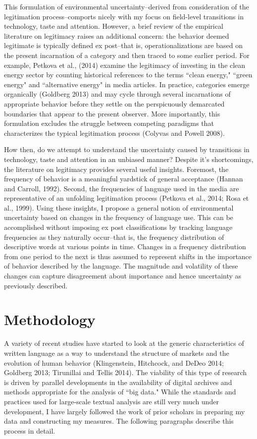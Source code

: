 This formulation of environmental uncertainty--derived from consideration of the legitimation process--comports nicely with my focus on field-level transitions in technology, taste and attention. However, a brief review of the empirical literature on legitimacy raises an additional concern: the behavior deemed legitimate is typically defined ex post--that is, operationalizations are based on the present incarnation of a category and then traced to some earlier period. For example, Petkova et al., (2014) examine the legitimacy of investing in the clean energy sector by counting historical references to the terms ``clean energy," ``green energy" and ``alternative energy" in media articles. In practice, categories emerge organically (Goldberg 2013) and may cycle through several incarnations of appropriate behavior before they settle on the perspicuously demarcated boundaries that appear to the present observer. More importantly, this formulation excludes the struggle between competing paradigms that characterizes the typical legitimation process (Colyvas and Powell 2008).

How then, do we attempt to understand the uncertainty caused by transitions in technology, taste and attention in an unbiased manner? Despite it's shortcomings, the literature on legitimacy provides several useful insights. Foremost, the frequency of  behavior is a meaningful yardstick of general acceptance (Hannan and Carroll, 1992). Second, the frequencies of language used in the media are representative of an unfolding legitimation process (Petkova et al., 2014; Rosa et al., 1999). Using these insights, I propose a general notion of environmental uncertainty based on changes in the frequency of language use. This can be accomplished without imposing ex post classifications by tracking language frequencies as they naturally occur--that is, the frequency distribution of descriptive words at various points in time. Changes in a frequency distribution from one period to the next is thus assumed to represent shifts in the importance of behavior described by the language. The magnitude and volatility of these changes can capture disagreement about importance and hence uncertainty as previously described. 

\section{Methodology}

A variety of recent studies have started to look at the generic characteristics of written language as a way to understand the structure of markets and the evolution of human behavior (Klingenstein, Hitchcock, and DeDeo 2014; Goldberg 2013; Tirunillai and Tellis 2014). The viability of this type of research is driven by parallel developments in the availability of digital archives and methods appropriate for the analysis of ``big data." While the standards and practices used for large-scale textual analysis are still very much under development, I have largely followed the work of prior scholars in preparing my data and constructing my measures. The following paragraphs describe this process in detail.

